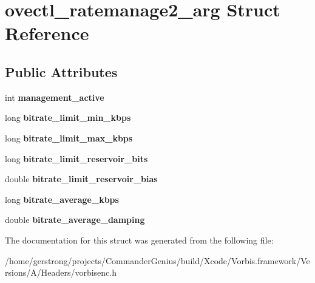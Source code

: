 \hypertarget{structovectl__ratemanage2__arg}{
\section{ovectl\_\-ratemanage2\_\-arg Struct Reference}
\label{structovectl__ratemanage2__arg}
}
\subsection*{Public Attributes}
\begin{DoxyCompactItemize}
\item 
\hypertarget{structovectl__ratemanage2__arg_aca1f656373a1597177dac924578e375b}{
int {\bfseries management\_\-active}}
\label{structovectl__ratemanage2__arg_aca1f656373a1597177dac924578e375b}

\item 
\hypertarget{structovectl__ratemanage2__arg_aeb53a17fff14ec50d143602adfdeabeb}{
long {\bfseries bitrate\_\-limit\_\-min\_\-kbps}}
\label{structovectl__ratemanage2__arg_aeb53a17fff14ec50d143602adfdeabeb}

\item 
\hypertarget{structovectl__ratemanage2__arg_a175691482003edd7d94592fa2bc993a9}{
long {\bfseries bitrate\_\-limit\_\-max\_\-kbps}}
\label{structovectl__ratemanage2__arg_a175691482003edd7d94592fa2bc993a9}

\item 
\hypertarget{structovectl__ratemanage2__arg_a75e496acac882e156137de9d1200ebd7}{
long {\bfseries bitrate\_\-limit\_\-reservoir\_\-bits}}
\label{structovectl__ratemanage2__arg_a75e496acac882e156137de9d1200ebd7}

\item 
\hypertarget{structovectl__ratemanage2__arg_a5567fde1798b1e80e40a77565b4b44f4}{
double {\bfseries bitrate\_\-limit\_\-reservoir\_\-bias}}
\label{structovectl__ratemanage2__arg_a5567fde1798b1e80e40a77565b4b44f4}

\item 
\hypertarget{structovectl__ratemanage2__arg_a1f6bab60d87143d5060dd6c59aad6e71}{
long {\bfseries bitrate\_\-average\_\-kbps}}
\label{structovectl__ratemanage2__arg_a1f6bab60d87143d5060dd6c59aad6e71}

\item 
\hypertarget{structovectl__ratemanage2__arg_a1069e148a884d8706928cd2e39870720}{
double {\bfseries bitrate\_\-average\_\-damping}}
\label{structovectl__ratemanage2__arg_a1069e148a884d8706928cd2e39870720}

\end{DoxyCompactItemize}


The documentation for this struct was generated from the following file:\begin{DoxyCompactItemize}
\item 
/home/gerstrong/projects/CommanderGenius/build/Xcode/Vorbis.framework/Versions/A/Headers/vorbisenc.h\end{DoxyCompactItemize}

